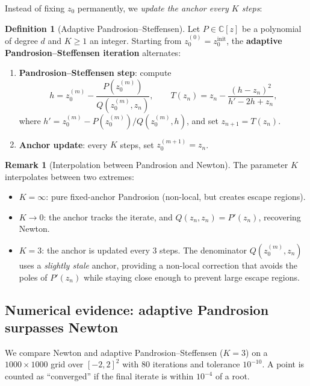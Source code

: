 \documentclass[11pt,a4paper]{article}
\theoremstyle{definition}
\newtheorem{definition}{Definition}[section]
\newtheorem{remark}{Remark}[section]
\newcommand{\CC}{\mathbb{C}}
\begin{document}
Instead of fixing $z_0$ permanently, we \emph{update the anchor every $K$ steps}:

\begin{definition}[Adaptive Pandrosion--Steffensen]
\label{def:adaptive}
Let $P \in \CC[z]$ be a polynomial of degree $d$ and $K \geq 1$ an integer.  Starting from $z_0^{(0)} = z_0^{\mathrm{init}}$, the \textbf{adaptive Pandrosion--Steffensen iteration} alternates:
\begin{enumerate}
  \item \textbf{Pandrosion--Steffensen step}: compute
  \[
    h = z_0^{(m)} - \frac{P(z_0^{(m)})}{Q(z_0^{(m)}, z_n)}, \qquad
    T(z_n) = z_n - \frac{(h - z_n)^2}{h' - 2h + z_n},
  \]
  where $h' = z_0^{(m)} - P(z_0^{(m)})/Q(z_0^{(m)}, h)$, and set $z_{n+1} = T(z_n)$.
  \item \textbf{Anchor update}: every $K$ steps, set $z_0^{(m+1)} = z_n$.
\end{enumerate}
\end{definition}

\begin{remark}[Interpolation between Pandrosion and Newton]
The parameter $K$ interpolates between two extremes:
\begin{itemize}
  \item $K = \infty$: pure fixed-anchor Pandrosion (non-local, but creates escape regions).
  \item $K \to 0$: the anchor tracks the iterate, and $Q(z_n, z_n) = P'(z_n)$, recovering Newton.
  \item $K = 3$: the anchor is updated every 3 steps.  The denominator $Q(z_0^{(m)}, z_n)$ uses a \emph{slightly stale} anchor, providing a non-local correction that avoids the poles of $P'(z_n)$ while staying close enough to prevent large escape regions.
\end{itemize}
\end{remark}

\subsection{Numerical evidence: adaptive Pandrosion surpasses Newton}

We compare Newton and adaptive Pandrosion--Steffensen ($K = 3$) on a $1000 \times 1000$ grid over $[-2,2]^2$ with $80$ iterations and tolerance $10^{-10}$.  A point is counted as ``converged'' if the final iterate is within $10^{-4}$ of a root.
\end{document}
